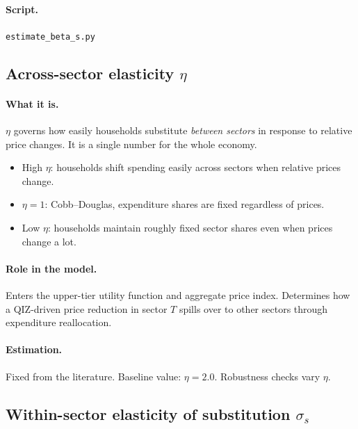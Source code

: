 \documentclass[12pt]{article}
\begin{document}
\paragraph{Script.} \texttt{estimate\_beta\_s.py}

\subsection{Across-sector elasticity $\eta$}

\paragraph{What it is.}
$\eta$ governs how easily households substitute \emph{between sectors} in
response to relative price changes. It is a single number for the whole
economy.
\begin{itemize}
  \item High $\eta$: households shift spending easily across sectors when
        relative prices change.
  \item $\eta = 1$: Cobb--Douglas, expenditure shares are fixed regardless
        of prices.
  \item Low $\eta$: households maintain roughly fixed sector shares even when
        prices change a lot.
\end{itemize}

\paragraph{Role in the model.}
Enters the upper-tier utility function and aggregate price index. Determines
how a QIZ-driven price reduction in sector $T$ spills over to other sectors
through expenditure reallocation.

\paragraph{Estimation.}
Fixed from the literature. Baseline value: $\eta = 2.0$.
Robustness checks vary $\eta$.

\subsection{Within-sector elasticity of substitution $\sigma_s$}
\end{document}
